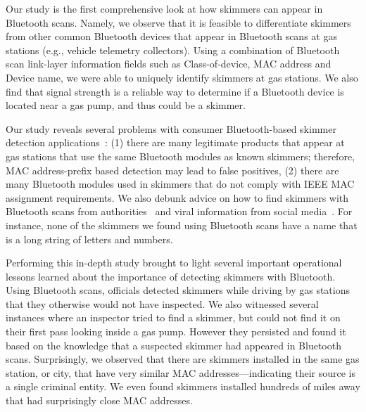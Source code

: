 
Our study is the first comprehensive look at how 
skimmers can appear in Bluetooth scans.
%
Namely, we observe that it is feasible to differentiate skimmers from other
common Bluetooth devices that appear in Bluetooth scans at gas stations (e.g.,
vehicle telemetry collectors).
%
Using a combination of Bluetooth scan link-layer information fields such as Class-of-device, MAC address and Device name, we were able to uniquely identify skimmers at gas stations.
%
%
We also find that signal strength is a reliable way to determine if a Bluetooth
device is located near a gas pump, and thus could be a skimmer.
%
%


 


Our study reveals several problems with consumer Bluetooth-based skimmer
detection applications~\cite{scaifeoakland,sparkfunapp,skimplus}:
%
(1) there are many legitimate products that appear at gas stations that use the
same Bluetooth modules as known skimmers; therefore, MAC address-prefix based detection 
may lead to false positives,
%
(2) there are many Bluetooth modules used in skimmers that do not comply with IEEE MAC
assignment requirements.
%
We also debunk advice on how to find skimmers with Bluetooth scans from authorities~\cite{ag-mn-skimmers} and viral information from social media~\cite{snopesskimmers}.
%
For instance, none of the skimmers we found using Bluetooth scans 
have a name that is a long string of letters and numbers.

Performing this in-depth study brought to light several important operational
lessons learned about the importance of detecting skimmers with Bluetooth.
%
Using Bluetooth scans, officials detected skimmers while
driving by gas stations that they otherwise would not have inspected.
%
We also witnessed several instances where an inspector tried to find a skimmer,
but could not find it on their first pass looking inside a gas pump. However they persisted and found it based on the
knowledge that a suspected skimmer had appeared in
Bluetooth scans.
%
Surprisingly, we observed that there are skimmers installed in the same gas station, or
city, that have very similar MAC addresses---indicating their source is a
single criminal entity.
%
We even found skimmers installed hundreds of miles away that had surprisingly
close MAC addresses.

